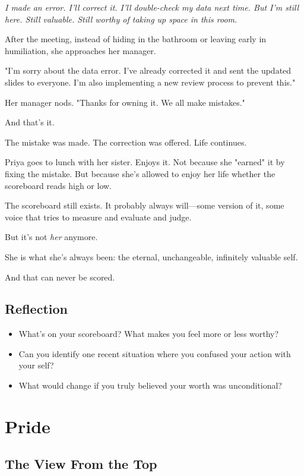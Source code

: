 \documentclass[11pt,twoside]{book}
\begin{document}
\emph{I made an error. I'll correct it. I'll double-check my data next time. But I'm still here. Still valuable. Still worthy of taking up space in this room.}

After the meeting, instead of hiding in the bathroom or leaving early in humiliation, she approaches her manager.

"I'm sorry about the data error. I've already corrected it and sent the updated slides to everyone. I'm also implementing a new review process to prevent this."

Her manager nods. "Thanks for owning it. We all make mistakes."

And that's it.

The mistake was made. The correction was offered. Life continues.

Priya goes to lunch with her sister. Enjoys it. Not because she "earned" it by fixing the mistake. But because she's allowed to enjoy her life whether the scoreboard reads high or low.

The scoreboard still exists. It probably always will—some version of it, some voice that tries to measure and evaluate and judge.

But it's not \emph{her} anymore.

She is what she's always been: the eternal, unchangeable, infinitely valuable self.

And that can never be scored.

\section*{Reflection}

\begin{itemize}
\item What's on your scoreboard? What makes you feel more or less worthy?
\item Can you identify one recent situation where you confused your action with your self?
\item What would change if you truly believed your worth was unconditional?
\end{itemize}

\chapter{Pride}

\section*{The View From the Top}
\end{document}
